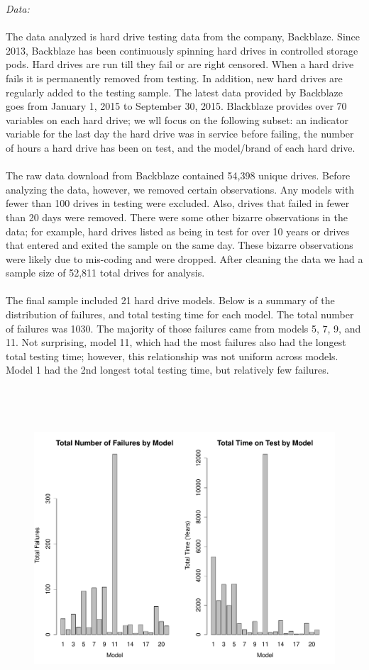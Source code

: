 \documentclass{article}
\begin{document}
\noindent \textit{Data:}\\\\
The data analyzed is hard drive testing data from the company, Backblaze.  Since 2013, Backblaze has been continuously spinning hard drives in controlled storage pods.  Hard drives are run till they fail or are right censored.  When a hard drive fails it is permanently removed from testing.  In addition, new hard drives are regularly added to the testing sample.  The latest data provided by Backblaze goes from January 1, 2015 to September 30, 2015.  Blackblaze provides over 70 variables on each hard drive; we wll focus on the following subset: an indicator variable for the last day the hard drive was in service before failing, the number of hours a hard drive has been on test, and the model/brand of each hard drive.\\\\
The raw data download from Backblaze contained 54,398 unique drives.  Before analyzing the data, however, we removed certain observations.  Any models with fewer than 100 drives in testing were excluded.  Also, drives that failed in fewer than 20 days were removed.  There were some other bizarre observations in the data; for example, hard drives listed as being in test for over 10 years or drives that entered and exited the sample on the same day.  These bizarre observations were likely due to mis-coding and were dropped.  After cleaning the data we had a sample size of 52,811 total drives for analysis.\\\\
The final sample included 21 hard drive models.  Below is a summary of the distribution of failures, and total testing time for each model.  The total number of failures was 1030.  The majority of those failures came from models 5, 7, 9, and 11.  Not surprising, model 11, which had the most failures also had the longest total testing time; however, this relationship was not uniform across models.  Model 1 had the 2nd longest total testing time, but relatively few failures.
\begin{figure}[H]
\centering
\includegraphics[height=12cm]{sumstat1.pdf}
\end{figure}
\end{document}
